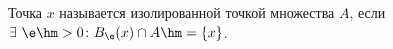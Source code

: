 
    Точка $x$ называется изолированной точкой множества $A$, если $\exists\ \e\hm>0\colon B_\e(x)\cap A\hm=\{x\}$.
